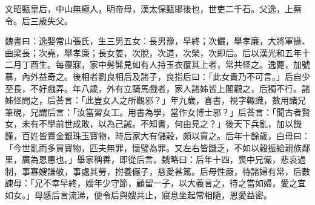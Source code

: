 
\begin{pinyinscope}
文昭甄皇后，中山無極人，明帝母，漢太保甄邯後也，世吏二千石。父逸，上蔡令。后三歲失父。

魏書曰：逸娶常山張氏，生三男五女：長男豫，早終；次儼，舉孝廉，大將軍掾、曲梁長；次堯，舉孝廉；長女姜，次脫，次道，次榮，次即后。后以漢光和五年十二月丁酉生。每寑寐，家中髣髴見如有人持玉衣覆其上者，常共怪之。逸薨，加號慕，內外益奇之。後相者劉良相后及諸子，良指后曰：「此女貴乃不可言。」后自少至長，不好戲弄。年八歲，外有立騎馬戲者，家人諸姊皆上閣觀之，后獨不行。諸姊怪問之，后荅言：「此豈女人之所觀邪？」年九歲，喜書，視字輙識，數用諸兄筆硯，兄謂后言：「汝當習女工。用書為學，當作女博士邪？」后荅言：「聞古者賢女，未有不學前世成敗，以為己誡。不知書，何由見之？」後天下兵亂，加以饑饉，百姓皆賣金銀珠玉寶物，時后家大有儲穀，頗以買之。后年十餘歲，白母曰：「今世亂而多買寶物，匹夫無罪，懷璧為罪。又左右皆饑乏，不如以穀振給親族鄰里，廣為恩惠也。」舉家稱善，即從后言。魏略曰：后年十四，喪中兄儼，悲哀過制，事寡嫂謙敬，事處其勞，拊養儼子，慈愛甚篤。后母性嚴，待諸婦有常，后數諫母：「兄不幸早終，嫂年少守節，顧留一子，以大義言之，待之當如婦，愛之宜如女。」母感后言流涕，便令后與嫂共止，寢息坐起常相隨，恩愛益密。


\end{pinyinscope}
